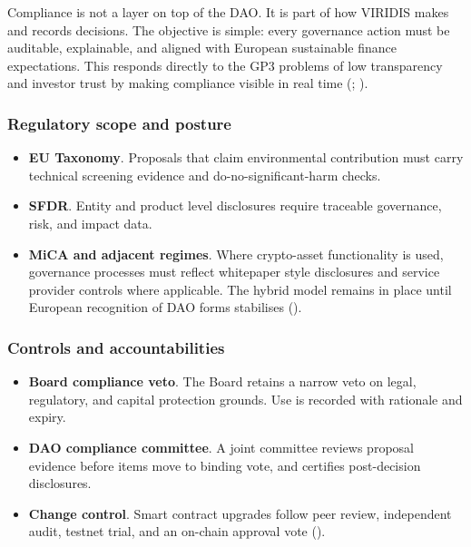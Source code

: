 \documentclass[
  english,
  12pt,
  oneside,
  open=any]{scrbook}
\providecommand{\tightlist}{%
  \setlength{\itemsep}{0pt}\setlength{\parskip}{0pt}}\usepackage{longtable,booktabs,array}
\begin{document}
Compliance is not a layer on top of the DAO. It is part of how VIRIDIS
makes and records decisions. The objective is simple: every governance
action must be auditable, explainable, and aligned with European
sustainable finance expectations. This responds directly to the GP3
problems of low transparency and investor trust by making compliance
visible in real time
(; ).

\subsubsection{Regulatory scope and
posture}\label{regulatory-scope-and-posture}

\begin{itemize}
\tightlist
\item
  \textbf{EU Taxonomy}. Proposals that claim environmental contribution
  must carry technical screening evidence and do-no-significant-harm
  checks.\\
\item
  \textbf{SFDR}. Entity and product level disclosures require traceable
  governance, risk, and impact data.\\
\item
  \textbf{MiCA and adjacent regimes}. Where crypto-asset functionality
  is used, governance processes must reflect whitepaper style
  disclosures and service provider controls where applicable. The hybrid
  model remains in place until European recognition of DAO forms
  stabilises ().
\end{itemize}

\subsubsection{Controls and
accountabilities}\label{controls-and-accountabilities}

\begin{itemize}
\tightlist
\item
  \textbf{Board compliance veto}. The Board retains a narrow veto on
  legal, regulatory, and capital protection grounds. Use is recorded
  with rationale and expiry.\\
\item
  \textbf{DAO compliance committee}. A joint committee reviews proposal
  evidence before items move to binding vote, and certifies
  post-decision disclosures.\\
\item
  \textbf{Change control}. Smart contract upgrades follow peer review,
  independent audit, testnet trial, and an on-chain approval vote
  ().
\end{itemize}
\end{document}
